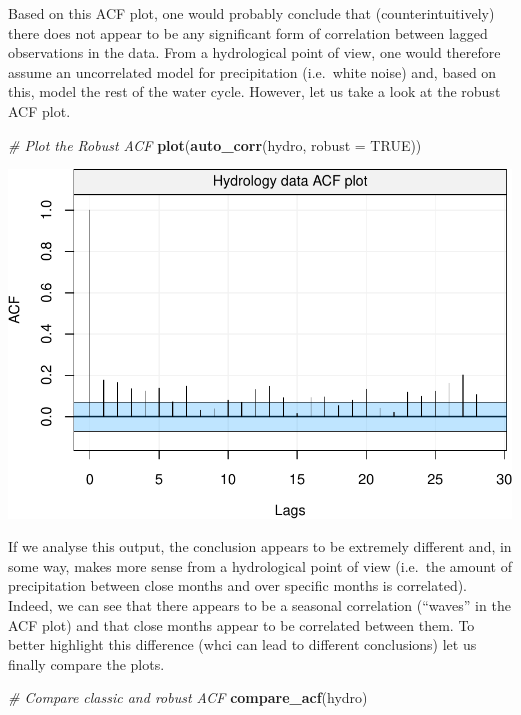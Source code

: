\documentclass[]{book}
\newenvironment{Shaded}{\begin{snugshade}}{\end{snugshade}}
\newcommand{\CommentTok}[1]{\textcolor[rgb]{0.56,0.35,0.01}{\textit{#1}}}
\newcommand{\DataTypeTok}[1]{\textcolor[rgb]{0.13,0.29,0.53}{#1}}
\newcommand{\KeywordTok}[1]{\textcolor[rgb]{0.13,0.29,0.53}{\textbf{#1}}}
\newcommand{\NormalTok}[1]{#1}
\newcommand{\OtherTok}[1]{\textcolor[rgb]{0.56,0.35,0.01}{#1}}
\theoremstyle{definition}
\theoremstyle{definition}
\theoremstyle{definition}
\theoremstyle{remark}
\begin{document}
Based on this ACF plot, one would probably conclude that
(counterintuitively) there does not appear to be any significant form of
correlation between lagged observations in the data. From a hydrological
point of view, one would therefore assume an uncorrelated model for
precipitation (i.e.~white noise) and, based on this, model the rest of
the water cycle. However, let us take a look at the robust ACF plot.

\begin{Shaded}
\begin{Highlighting}[]
\CommentTok{# Plot the Robust ACF}
\KeywordTok{plot}\NormalTok{(}\KeywordTok{auto_corr}\NormalTok{(hydro, }\DataTypeTok{robust =} \OtherTok{TRUE}\NormalTok{))}
\end{Highlighting}
\end{Shaded}

\includegraphics{ts_files/figure-latex/unnamed-chunk-24-1.pdf}

If we analyse this output, the conclusion appears to be extremely
different and, in some way, makes more sense from a hydrological point
of view (i.e.~the amount of precipitation between close months and over
specific months is correlated). Indeed, we can see that there appears to
be a seasonal correlation (``waves'' in the ACF plot) and that close
months appear to be correlated between them. To better highlight this
difference (whci can lead to different conclusions) let us finally
compare the plots.

\begin{Shaded}
\begin{Highlighting}[]
\CommentTok{# Compare classic and robust ACF}
\KeywordTok{compare_acf}\NormalTok{(hydro)}
\end{Highlighting}
\end{Shaded}
\end{document}
